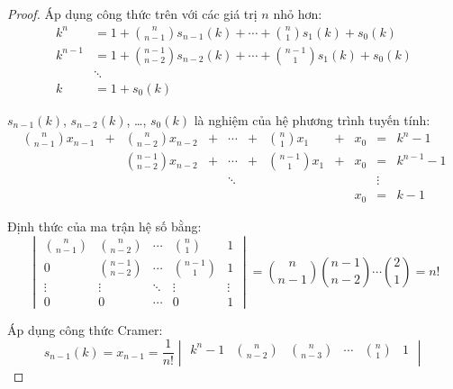 \documentclass[class=linearalgebra,crop=false]{standalone}
\begin{document}
\begin{proof}
    \par Áp dụng công thức trên với các giá trị $n$ nhỏ hơn:
    \begin{align*}
        k^{n}   & = 1 + \binom{n}{n-1}s_{n-1}(k) + \cdots + \binom{n}{1}s_{1}(k) + s_{0}(k)     \\
        k^{n-1} & = 1 + \binom{n-1}{n-2}s_{n-2}(k) + \cdots + \binom{n-1}{1}s_{1}(k) + s_{0}(k) \\
                & \ddots                                                                        \\
        k       & = 1 + s_{0}(k)
    \end{align*}
    \par $s_{n-1}(k)$, $s_{n-2}(k)$, \ldots, $s_{0}(k)$ là nghiệm của hệ phương trình tuyến tính:
    \[
        \begin{array}{ccccccccccc}
            \binom{n}{n-1}x_{n-1} & + & \binom{n}{n-2}x_{n-2}   & + & \cdots & + & \binom{n}{1}x_{1}   & + & x_{0} & =      & k^{n} - 1   \\
                                  &   & \binom{n-1}{n-2}x_{n-2} & + & \cdots & + & \binom{n-1}{1}x_{1} & + & x_{0} & =      & k^{n-1} - 1 \\
                                  &   &                         &   & \ddots &   &                     &   &       & \vdots &             \\
                                  &   &                         &   &        &   &                     &   & x_{0} & =      & k - 1
        \end{array}
    \]
    \par Định thức của ma trận hệ số bằng:
    \[
        \begin{vmatrix}
            \binom{n}{n-1} & \binom{n}{n-2}   & \cdots & \binom{n}{1}   & 1      \\
            0              & \binom{n-1}{n-2} & \cdots & \binom{n-1}{1} & 1      \\
            \vdots         & \vdots           & \ddots & \vdots         & \vdots \\
            0              & 0                & \cdots & 0              & 1
        \end{vmatrix}
        = \binom{n}{n-1}\binom{n-1}{n-2}\cdots\binom{2}{1}
        = n!
    \]
    \par Áp dụng công thức Cramer:
    \[
        s_{n-1}(k) = x_{n-1} = \dfrac{1}{n!}
        \begin{vmatrix}
            k^{n} - 1   & \binom{n}{n-2} & \binom{n}{n-3}   & \cdots & \binom{n}{1}   & 1      \\

\end{vmatrix}\]
\end{proof}
\end{document}
